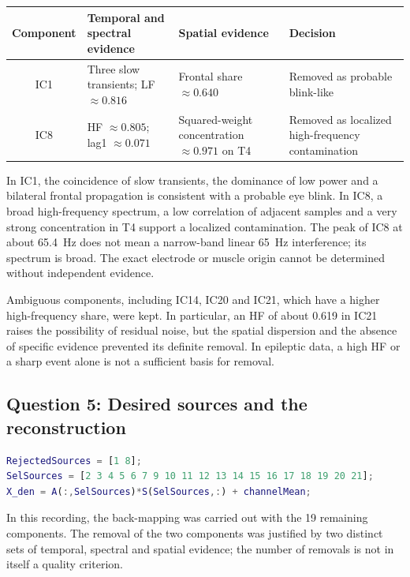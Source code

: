 \begin{center}
\begin{tabularx}{\textwidth}{@{}c>{\raggedright\arraybackslash}X>{\raggedright\arraybackslash}X>{\raggedright\arraybackslash}X@{}}
\toprule
\textbf{Component} & \textbf{Temporal and spectral evidence} & \textbf{Spatial evidence} & \textbf{Decision}\\
\midrule
IC1 & Three slow transients; LF $\approx 0.816$ & Frontal share $\approx 0.640$ & Removed as probable blink-like\\
IC8 & HF $\approx 0.805$; lag1 $\approx 0.071$ & Squared-weight concentration $\approx 0.971$ on T4 & Removed as localized high-frequency contamination\\
\bottomrule
\end{tabularx}
\end{center}

In IC1, the coincidence of slow transients, the dominance of low power and a bilateral frontal propagation is consistent with a probable eye blink. In IC8, a broad high-frequency spectrum, a low correlation of adjacent samples and a very strong concentration in T4 support a localized contamination. The peak of IC8 at about 65.4~Hz does not mean a narrow-band linear 65~Hz interference; its spectrum is broad. The exact electrode or muscle origin cannot be determined without independent evidence.

Ambiguous components, including IC14, IC20 and IC21, which have a higher high-frequency share, were kept. In particular, an HF of about 0.619 in IC21 raises the possibility of residual noise, but the spatial dispersion and the absence of specific evidence prevented its definite removal. In epileptic data, a high HF or a sharp event alone is not a sufficient basis for removal.

\subsection*{Question 5: Desired sources and the reconstruction}

\begin{lstlisting}[language=Matlab]
RejectedSources = [1 8];
SelSources = [2 3 4 5 6 7 9 10 11 12 13 14 15 16 17 18 19 20 21];
X_den = A(:,SelSources)*S(SelSources,:) + channelMean;
\end{lstlisting}

In this recording, the back-mapping was carried out with the 19 remaining components. The removal of the two components was justified by two distinct sets of temporal, spectral and spatial evidence; the number of removals is not in itself a quality criterion.

